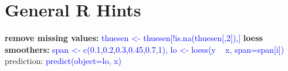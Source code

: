 \section{General R Hints}
\textbf{remove missing values: } \textcolor{blue}{thuesen <- thuesen[!is.na(thuesen[,2]),]}
\textbf{loess smoothers: } \textcolor{blue}{span <- c(0.1,0.2,0.3,0.45,0.7,1), lo <- loess(y ~ x, span=span[i])} prediction: \textcolor{blue}{predict(object=lo, x)}
